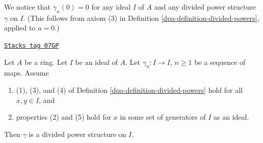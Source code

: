 We notice that $\gamma_n\left(0\right) = 0$ for any ideal $I$ of
$A$ and any divided power structure $\gamma$ on $I$. (This follows
from axiom (3) in Definition \ref{dpa-definition-divided-powers},
applied to $a=0$.)

\begin{lemma}
\label{dpa-lemma-check-on-generators}
\href{https://stacks.math.columbia.edu/tag/07GP}{\texttt{Stacks tag 07GP}}

Let $A$ be a ring. Let $I$ be an ideal of $A$. Let $\gamma_n : I \to I$,
$n \geq 1$ be a sequence of maps. Assume
\begin{enumerate}
\item[(a)] (1), (3), and (4) of Definition \ref{dpa-definition-divided-powers}
hold for all $x, y \in I$, and
\item[(b)] properties (2) and (5) hold for $x$ in
some set of generators of $I$ as an ideal.
\end{enumerate}
Then $\gamma$ is a divided power structure on $I$.
\end{lemma}

